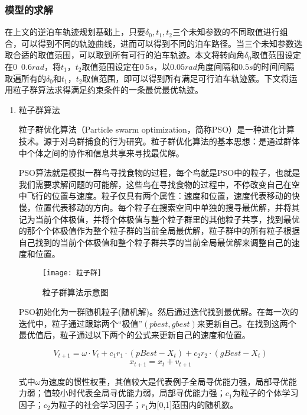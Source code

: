 \documentclass{MathorCupmodeling}
\begin{document}
	\subsubsection{模型的求解}
	在上文的逆泊车轨迹规划基础上，只要$\delta_0,t_1,t_2$三个未知参数的不同取值进行组合，可以得到不同的轨迹曲线，进而可以得到不同的泊车路径。当三个未知参数选取合适的取值范围，可以取到所有可行的泊车轨迹。本文将转向角$\delta_0$取值范围设定在$0$~$0.6rad$，将$t_1$，$t_2$取值范围设定在$0~5s$，以$0.05rad$角度间隔和$0.5s$的时间间隔取遍所有的$\delta_0$和$t_1$，$t_2$取值范围，即可以得到所有满足可行泊车轨迹簇。下文将运用粒子群算法求得满足约束条件的一条最优最优轨迹。
	\begin{enumerate}
		\item 粒子群算法
		
		粒子群优化算法（Particle swarm optimization，简称PSO）是一种进化计算技术。源于对鸟群捕食的行为研究。粒子群优化算法的基本思想：是通过群体中个体之间的协作和信息共享来寻找最优解。

		PSO算法就是模拟一群鸟寻找食物的过程，每个鸟就是PSO中的粒子，也就是我们需要求解问题的可能解，这些鸟在寻找食物的过程中，不停改变自己在空中飞行的位置与速度。粒子仅具有两个属性：速度和位置，速度代表移动的快慢，位置代表移动的方向。每个粒子在搜索空间中单独的搜寻最优解，并将其记为当前个体极值，并将个体极值与整个粒子群里的其他粒子共享，找到最优的那个个体极值作为整个粒子群的当前全局最优解，粒子群中的所有粒子根据自己找到的当前个体极值和整个粒子群共享的当前全局最优解来调整自己的速度和位置。

			  \begin{figure}[H]
				\centering
				\texttt{[image: 粒子群]}
				\caption{粒子群算法示意图}
				\label{fig:circuit-diagram}
			\end{figure}

		PSO初始化为一群随机粒子(随机解)。然后通过迭代找到最优解。在每一次的迭代中，粒子通过跟踪两个“极值”$(pbest,gbest)$来更新自己。在找到这两个最优值后，粒子通过以下两个的公式来更新自己的速度和位置。
		
		\begin{equation}
			V_{t+1}=\omega\cdot V_t+c_1r_1\cdot(pBest-X_t)+c_2r_2\cdot(gBest-X_t)
		\end{equation}
		\begin{equation}
			x_{t+1}=x_t+v_{t+1}
		\end{equation}

		式中$\omega$为速度的惯性权重，其值较大是代表例子全局寻优能力强，局部寻优能力弱；值较小时代表全局寻优能力弱，局部寻优能力强；$c_1$为粒子的个体学习因子；$c_2$为粒子的社会学习因子；$r_1$为[0,1]范围内的随机数。


\end{enumerate}
\end{document}
